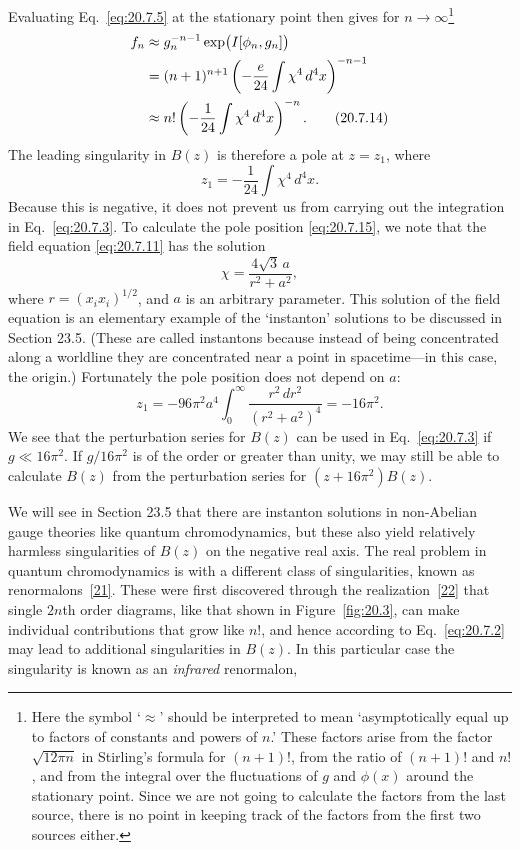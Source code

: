 Evaluating Eq.~\eqref{eq:20.7.5} at the stationary point then gives for $n\to\infty$\footnote{Here the symbol `$\approx$' should be interpreted to mean `asymptotically equal up to factors of constants and powers of $n$.' These factors arise from the factor $\sqrt{12\pi n}$ in Stirling's formula for $(n+1)!$, from the ratio of $(n+1)!$ and $n!$, and from the integral over the fluctuations of $g$ and $\phi(x)$ around the stationary point. Since we are not going to calculate the factors from the last source, there is no point in keeping track of the factors from the first two sources either.}
\begin{align}
f_n
&\approx g_n^{-n-1}\exp\bigl(I[\phi_n,g_n]\bigr)
\notag\\
&=(n+1)^{n+1}
\left(-\frac{e}{24}\int\chi^4\,d^4x\right)^{-n-1}
\notag\\
&\approx n!
\left(-\frac1{24}\int\chi^4\,d^4x\right)^{-n}.
\tag{20.7.14}\label{eq:20.7.14}
\end{align}
The leading singularity in $B(z)$ is therefore a pole at $z=z_1$, where
\begin{equation}
z_1=-\frac1{24}\int\chi^4\,d^4x.
\tag{20.7.15}\label{eq:20.7.15}
\end{equation}
Because this is negative, it does not prevent us from carrying out the integration in Eq.~\eqref{eq:20.7.3}. To calculate the pole position \eqref{eq:20.7.15}, we note that the field equation \eqref{eq:20.7.11} has the solution
\begin{equation}
\chi=\frac{4\sqrt3\,a}{r^2+a^2},
\tag{20.7.16}\label{eq:20.7.16}
\end{equation}
where $r=(x_ix_i)^{1/2}$, and $a$ is an arbitrary parameter. This solution of the field equation is an elementary example of the `instanton' solutions to be discussed in Section 23.5. (These are called instantons because instead of being concentrated along a worldline they are concentrated near a point in spacetime---in this case, the origin.) Fortunately the pole position does not depend on $a$:
\begin{equation}
z_1
=-96\pi^2a^4\int_0^\infty\frac{r^2\,dr^2}{(r^2+a^2)^4}
=-16\pi^2.
\tag{20.7.17}\label{eq:20.7.17}
\end{equation}
We see that the perturbation series for $B(z)$ can be used in Eq.~\eqref{eq:20.7.3} if $g\ll16\pi^2$. If $g/16\pi^2$ is of the order or greater than unity, we may still be able to calculate $B(z)$ from the perturbation series for $(z+16\pi^2)B(z)$.

We will see in Section 23.5 that there are instanton solutions in non-Abelian gauge theories like quantum chromodynamics, but these also yield relatively harmless singularities of $B(z)$ on the negative real axis. The real problem in quantum chromodynamics is with a different class of singularities, known as renormalons~\hyperref[ch20-ref-21]{[21]}. These were first discovered through the realization~\hyperref[ch20-ref-22]{[22]} that single $2n$th order diagrams, like that shown in Figure~\ref{fig:20.3}, can make individual contributions that grow like $n!$, and hence according to Eq.~\eqref{eq:20.7.2} may lead to additional singularities in $B(z)$. In this particular case the singularity is known as an \emph{infrared} renormalon,

